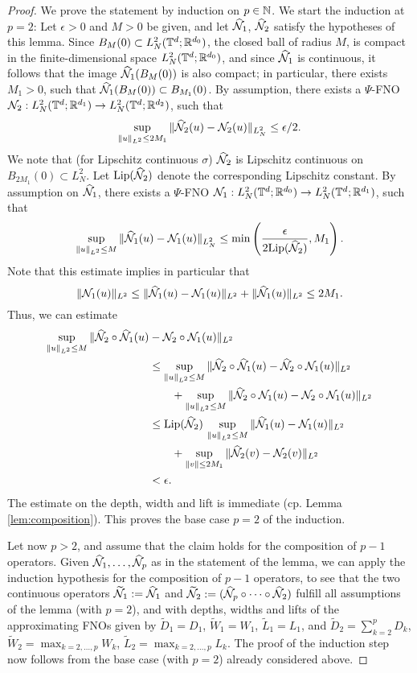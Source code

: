 \documentclass[reqno,a4paper]{amsart}
\begin{document}
\begin{proof}
We prove the statement by induction on $p\in \mathbb{N}$. We start the induction at $p=2$: Let $\epsilon > 0$ and $M>0$ be given, and let $\widehat{\mathcal{N}}_1$, $\widehat{\mathcal{N}}_2$ satisfy the hypotheses of this lemma. Since $B_M(0) \subset L^2_N(\mathbb{T}^d;\mathbb{R}^{d_0})$, the closed ball of radius $M$, is compact in the finite-dimensional space $L^2_N(\mathbb{T}^d;\mathbb{R}^{d_0})$, and since $\widehat{\mathcal{N}}_1$ is continuous, it follows that the image $\widehat{\mathcal{N}}_1(B_M(0))$ is also compact; in particular, there exists $M_1> 0$, such that $\widehat{\mathcal{N}}_1(B_M(0)) \subset B_{M_1}(0)$. By assumption, there exists a $\Psi$-FNO $\mathcal{N}_2: L^2_N(\mathbb{T}^d;\mathbb{R}^{d_1}) \to L^2_N(\mathbb{T}^d;\mathbb{R}^{d_2})$, such that 
\[
\sup_{\Vert u \Vert_{L^2} \le 2M_1} \Vert \widehat{\mathcal{N}}_2(u) - \mathcal{N}_2(u) \Vert_{L^2_N} \le \epsilon/2.
\]
We note that (for Lipschitz continuous $\sigma$) $\widehat{\mathcal{N}}_2$ is Lipschitz continuous on $B_{2M_1}(0)\subset L^2_N$. Let $\mathrm{Lip}(\widehat{\mathcal{N}}_2)$ denote the corresponding Lipschitz constant. By assumption on $\widehat{\mathcal{N}}_1$, there exists a $\Psi$-FNO $\mathcal{N}_1: L^2_N(\mathbb{T}^d;\mathbb{R}^{d_0}) \to L^2_N(\mathbb{T}^d;\mathbb{R}^{d_1})$, such that 
\[
\sup_{\Vert u \Vert_{L^2} \le M} \Vert \widehat{\mathcal{N}}_1(u) - \mathcal{N}_1(u) \Vert_{L^2_N} \le \min\left(\frac{\epsilon}{2\mathrm{Lip}(\widehat{\mathcal{N}}_2)}, M_1\right).
\]
Note that this estimate implies in particular that 
\[
\Vert \mathcal{N}_1(u) \Vert_{L^2} \le \Vert\widehat{\mathcal{N}}_1(u) -  \mathcal{N}_1(u) \Vert_{L^2} + \Vert \widehat{\mathcal{N}}_1(u) \Vert_{L^2} \le 2M_1.
\]
Thus, we can estimate
\begin{align*}
\sup_{\Vert u \Vert_{L^2} \le M} \Vert \widehat{\mathcal{N}}_2\circ \widehat{\mathcal{N}}_1(u) &- \mathcal{N}_2 \circ \mathcal{N}_1(u) \Vert_{L^2}
\\
&\le
\sup_{\Vert u \Vert_{L^2} \le M} \Vert \widehat{\mathcal{N}}_2\circ \widehat{\mathcal{N}}_1(u) - \widehat{\mathcal{N}}_2 \circ \mathcal{N}_1(u) \Vert_{L^2}
\\
&\qquad +
\sup_{\Vert u \Vert_{L^2} \le M} \Vert \widehat{\mathcal{N}}_2\circ \mathcal{N}_1(u) - \mathcal{N}_2 \circ \mathcal{N}_1(u) \Vert_{L^2}
\\
&\le
\mathrm{Lip}(\widehat{\mathcal{N}}_2) \,
\sup_{\Vert u \Vert_{L^2} \le M} \Vert \widehat{\mathcal{N}}_1(u) - \mathcal{N}_1(u) \Vert_{L^2}
\\
&\qquad +
\sup_{\Vert v\Vert\le 2M_1} \Vert \widehat{\mathcal{N}}_2(v) - \mathcal{N}_2(v) \Vert_{L^2}
\\
&< \epsilon.
\end{align*}
The estimate on the depth, width and lift is immediate (cp. Lemma \ref{lem:composition}). This proves the base case $p=2$ of the induction. 

Let now $p>2$, and assume that the claim holds for the composition of $p-1$ operators. Given $\widehat{\mathcal{N}}_1, \dots, \widehat{\mathcal{N}}_p$ as in the statement of the lemma, we can apply the induction hypothesis for the composition of $p-1$ operators, to see that the two continuous operators $\widetilde{\mathcal{N}}_1:=\widehat{\mathcal{N}}_1$ and $\widetilde{\mathcal{N}}_2 := (\widehat{\mathcal{N}}_p\circ \dots \circ \widehat{\mathcal{N}}_2)$ fulfill all assumptions of the lemma (with $p=2$), and with depths, widths and lifts of the approximating FNOs given by $\tilde{D}_1 = D_1$, $\tilde{W}_1 = W_1$, $\tilde{L}_1 = L_1$, and $\tilde{D}_2 = \sum_{k=2}^p D_k$, $\tilde{W}_2 = \max_{k=2,\dots, p} W_k$, $\tilde{L}_2 = \max_{k=2,\dots, p} L_k$. The proof of the induction step now follows from the base case (with $p=2$) already considered above.
\end{proof}
\end{document}
